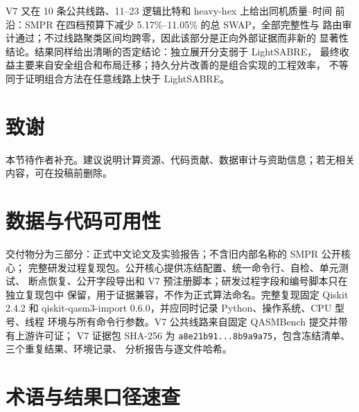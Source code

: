 \documentclass[11pt,a4paper]{article}
\begin{document}
V7 又在 10 条公共线路、11--23 逻辑比特和 heavy-hex 上给出同机质量--时间
前沿：SMPR 在四档预算下减少 5.17\%--11.05\% 的总 SWAP，全部完整性与
路由审计通过；不过线路聚类区间均跨零，因此该部分是正向外部证据而非新的
显著性结论。结果同样给出清晰的否定结论：独立展开分支弱于 LightSABRE，
最终收益主要来自安全组合和布局迁移；持久分片改善的是组合实现的工程效率，
不等同于证明组合方法在任意线路上快于 LightSABRE。

\section*{致谢}

本节待作者补充。建议说明计算资源、代码贡献、数据审计与资助信息；若无相关内容，可在投稿前删除。

\section*{数据与代码可用性}

交付物分为三部分：正式中文论文及实验报告；不含旧内部名称的 SMPR 公开核心；
完整研发过程复现包。公开核心提供冻结配置、统一命令行、自检、单元测试、
断点恢复、公开字段导出和 V7 预注册脚本；研发过程字段和编号脚本只在独立复现包中
保留，用于证据兼容，不作为正式算法命名。完整复现固定 Qiskit 2.4.2 和
qiskit-qasm3-import 0.6.0，并应同时记录 Python、操作系统、CPU 型号、线程
环境与所有命令行参数。V7 公共线路来自固定 QASMBench 提交并带有上游许可证；
V7 证据包 SHA-256 为
\texttt{a8e21b91...8b9a9a75}，包含冻结清单、三个重复结果、环境记录、
分析报告与逐文件哈希。

\begingroup
\sloppy
\raggedright


\endgroup

\appendix

\section{术语与结果口径速查}
\end{document}
